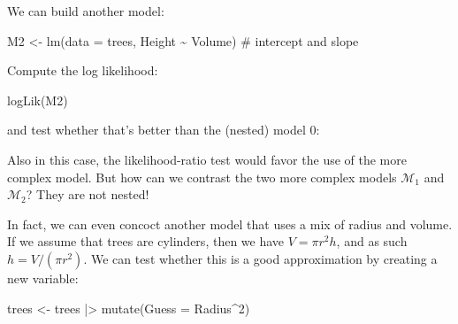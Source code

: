 \documentclass[
  letterpaper,
  DIV=11,
  numbers=noendperiod]{scrreprt}
\newenvironment{Shaded}{\begin{snugshade}}{\end{snugshade}}
\newcommand{\NormalTok}[1]{\textcolor[rgb]{0.00,0.23,0.31}{#1}}
\begin{document}
We can build another model:

\begin{Shaded}
\begin{Highlighting}[]
\NormalTok{M2 \textless{}{-} lm(data = trees, Height \textasciitilde{} Volume) \# intercept and slope}
\end{Highlighting}
\end{Shaded}

Compute the log likelihood:

\begin{Shaded}
\begin{Highlighting}[]
\NormalTok{logLik(M2)}
\end{Highlighting}
\end{Shaded}

and test whether that's better than the (nested) model 0:

\begin{Shaded}
\end{Shaded}

Also in this case, the likelihood-ratio test would favor the use of the
more complex model. But how can we contrast the two more complex models
\(\mathcal M_1\) and \(\mathcal M_2\)? They are not nested!

In fact, we can even concoct another model that uses a mix of radius and
volume. If we assume that trees are cylinders, then we have
\(V = \pi r^2 h\), and as such \(h = V / (\pi r^2)\). We can test
whether this is a good approximation by creating a new variable:

\begin{Shaded}
\begin{Highlighting}[]
\NormalTok{trees \textless{}{-} trees |\textgreater{} mutate(Guess = Radius\^{}2)}
\end{Highlighting}
\end{Shaded}
\end{document}
